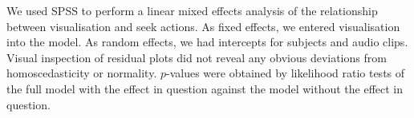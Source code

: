 We used SPSS to perform a linear mixed effects analysis of the relationship between visualisation and seek actions. As
fixed effects, we entered visualisation into the model. As random effects, we had intercepts for subjects and audio
clips. Visual inspection of residual plots did not reveal any obvious deviations from homoscedasticity or normality.
$p$-values were obtained by likelihood ratio tests of the full model with the effect in question against the model
without the effect in question.





